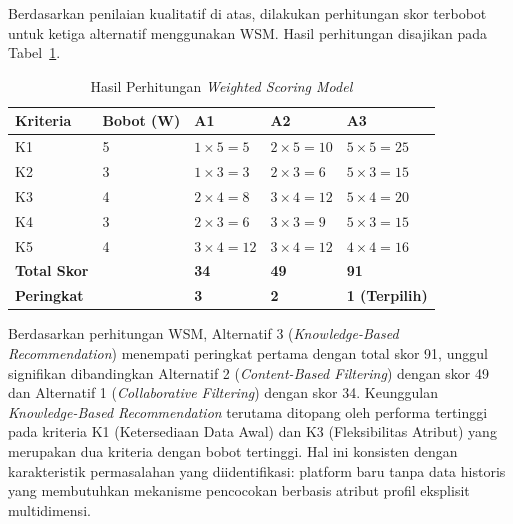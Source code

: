 Berdasarkan penilaian kualitatif di atas, dilakukan perhitungan skor terbobot untuk ketiga alternatif menggunakan WSM. Hasil perhitungan disajikan pada Tabel~\ref{tab:wsm-hasil}.

\begin{table}[H]
  \caption{Hasil Perhitungan \emph{Weighted Scoring Model}}
  \label{tab:wsm-hasil}
  \begin{tabularx}{\textwidth}{p{2cm} p{2cm} X X X}
    \toprule
    \textbf{Kriteria} & \textbf{Bobot (W)} & \textbf{A1} & \textbf{A2} & \textbf{A3} \\
    \midrule
    K1 & 5 & $1 \times 5 = 5$  & $2 \times 5 = 10$ & $5 \times 5 = 25$ \\
    \midrule
    K2 & 3 & $1 \times 3 = 3$  & $2 \times 3 = 6$  & $5 \times 3 = 15$ \\
    \midrule
    K3 & 4 & $2 \times 4 = 8$  & $3 \times 4 = 12$ & $5 \times 4 = 20$ \\
    \midrule
    K4 & 3 & $2 \times 3 = 6$  & $3 \times 3 = 9$  & $5 \times 3 = 15$ \\
    \midrule
    K5 & 4 & $3 \times 4 = 12$ & $3 \times 4 = 12$ & $4 \times 4 = 16$ \\
    \midrule
    \textbf{Total Skor} & & \textbf{34} & \textbf{49} & \textbf{91} \\
    \midrule
    \textbf{Peringkat}  & & \textbf{3} & \textbf{2} & \textbf{1 (Terpilih)} \\
    \bottomrule
  \end{tabularx}
\end{table}

Berdasarkan perhitungan WSM, Alternatif 3 (\emph{Knowledge-Based Recommendation}) menempati peringkat pertama dengan total skor 91, unggul signifikan dibandingkan Alternatif 2 (\emph{Content-Based Filtering}) dengan skor 49 dan Alternatif 1 (\emph{Collaborative Filtering}) dengan skor 34. Keunggulan \emph{Knowledge-Based Recommendation} terutama ditopang oleh performa tertinggi pada kriteria K1 (Ketersediaan Data Awal) dan K3 (Fleksibilitas Atribut) yang merupakan dua kriteria dengan bobot tertinggi. Hal ini konsisten dengan karakteristik permasalahan yang diidentifikasi: platform baru tanpa data historis yang membutuhkan mekanisme pencocokan berbasis atribut profil eksplisit multidimensi.